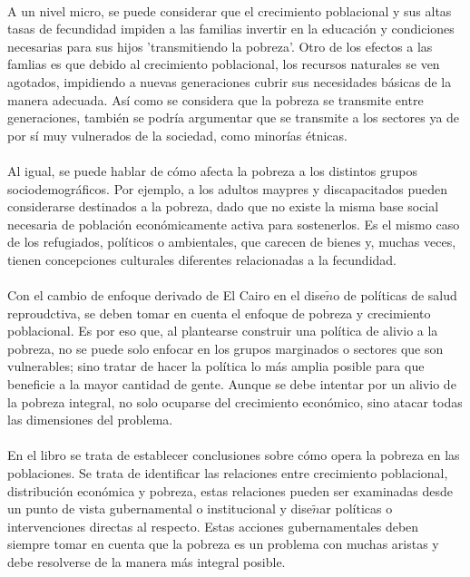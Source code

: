\documentclass[11pt,spanish,letterpaper]{article}
\theoremstyle{plain}
\begin{document}
\\
A un nivel micro, se puede considerar que el crecimiento poblacional y sus altas tasas de fecundidad impiden a las familias invertir en la educaci\'on y condiciones necesarias para sus hijos 'transmitiendo la pobreza'. Otro de los efectos a las famlias es que debido al crecimiento poblacional, los recursos naturales se ven agotados, impidiendo a nuevas generaciones cubrir sus necesidades b\'asicas de la manera adecuada. As\'i como se considera que la pobreza se transmite entre generaciones, tambi\'en se podr\'ia argumentar que se transmite a los sectores ya de por s\'i muy vulnerados de la sociedad, como minor\'ias \'etnicas.\\
\\
Al igual, se puede hablar de c\'omo afecta la pobreza a los distintos grupos sociodemogr\'aficos. Por ejemplo, a los adultos maypres y discapacitados pueden considerarse destinados a la pobreza, dado que no existe la misma base social necesaria de poblaci\'on econ\'omicamente activa para sostenerlos. Es el mismo caso de los refugiados, pol\'iticos o ambientales, que carecen de bienes y, muchas veces, tienen concepciones culturales diferentes relacionadas a la fecundidad.\\
\\
Con el cambio de enfoque derivado de El Cairo en el dise$\tilde{n}$o de pol\'iticas de salud reproudctiva, se deben tomar en cuenta el enfoque de pobreza y crecimiento poblacional. Es por eso que, al plantearse construir una pol\'itica de alivio a la pobreza, no se puede solo enfocar en los grupos marginados o sectores que son vulnerables; sino tratar de hacer la pol\'itica lo m\'as amplia posible para que beneficie a la mayor cantidad de gente. Aunque se debe intentar por un alivio de la pobreza integral, no solo ocuparse del crecimiento econ\'omico, sino atacar todas las dimensiones del problema.\\
\\
En el libro se trata de establecer conclusiones sobre c\'omo opera la pobreza en las poblaciones. Se trata de identificar las relaciones entre crecimiento poblacional, distribuci\'on econ\'omica y pobreza, estas relaciones pueden ser examinadas desde un punto de vista gubernamental o institucional y dise$\tilde{n}$ar pol\'iticas o intervenciones directas al respecto. Estas acciones gubernamentales deben siempre tomar en cuenta que la pobreza es un problema con muchas aristas y debe resolverse de la manera m\'as integral posible.


\end{document}

